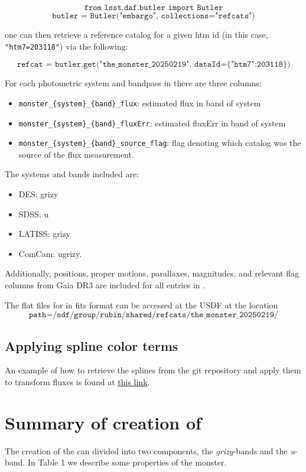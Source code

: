 $$\texttt{from lsst.daf.butler import Butler}$$
$$\texttt{butler = Butler("embargo", collections="refcats")}$$

one can then retrieve a reference catalog for a given htm id (in this case, \texttt{"htm7=203118"}) via the following:

$$\texttt{refcat = butler.get("the\_monster\_20250219", dataId=\{"htm7":203118\})}$$

For each photometric system and bandpass in \monster there are three columns:
\begin{itemize}
    \item \texttt{monster\_\{system\}\_\{band\}\_flux}: estimated flux in band of system
    \item \texttt{monster\_\{system\}\_\{band\}\_fluxErr}: estimated fluxErr in band of system
    \item \texttt{monster\_\{system\}\_\{band\}\_source\_flag}: flag denoting which catalog was the source of the flux measurement.
\end{itemize}

The systems and bands included are:
\begin{itemize}
    \item DES: grizy
    \item SDSS: u
    \item LATISS: grizy
    \item ComCam: ugrizy.
\end{itemize}

Additionally, positions, proper motions, parallaxes, magnitudes, and relevant flag columns from Gaia DR3 are included for all entries in \monster.

The flat files for \monster in fits format can be accessed at the USDF at the location
$$\texttt{path=/sdf/group/rubin/shared/refcats/the\_monster\_20250219/}$$

\subsection{Applying spline color terms}

An example of how to retrieve the splines from the git repository and apply them to transform fluxes is found at \href{https://github.com/lsst-dm/dmtn-277/blob/main/notebooks/apply_monster_transformations.ipynb}{this link}.

\section{Summary of creation of \monster}
\label{sec:summary}
The creation of the \monster can divided into two components, the \textit{grizy}-bands and the \textit{u}-band.
In Table 1 we describe some properties of the monster.


